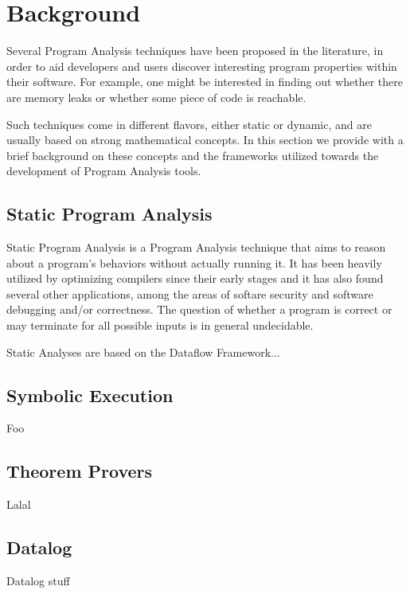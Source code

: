 
\chapter{Background}\label{c:background}

Several Program Analysis techniques have been proposed in the literature, in
order to aid developers and users discover interesting program properties within
their software. For example, one might be interested in finding out whether
there are memory leaks or whether some piece of code is reachable.

Such techniques come in different flavors, either static or dynamic, and are
usually based on strong mathematical concepts. In this section we provide with
a brief background on these concepts and the frameworks utilized towards 
the development of Program Analysis tools.

\section{Static Program Analysis}

Static Program Analysis is a Program Analysis technique that aims to reason
about a program's behaviors without actually running it. It has been
heavily utilized by optimizing compilers since their early stages and it
has also found several other applications, among the areas of softare security
and software debugging and/or correctness\cite{spa}. The question of whether 
a program is correct or may terminate for all possible inputs is in general
undecidable.

Static Analyses are based on the Dataflow Framework...

\section{Symbolic Execution}
Foo

\section{Theorem Provers}
Lalal

\section{Datalog}
Datalog stuff